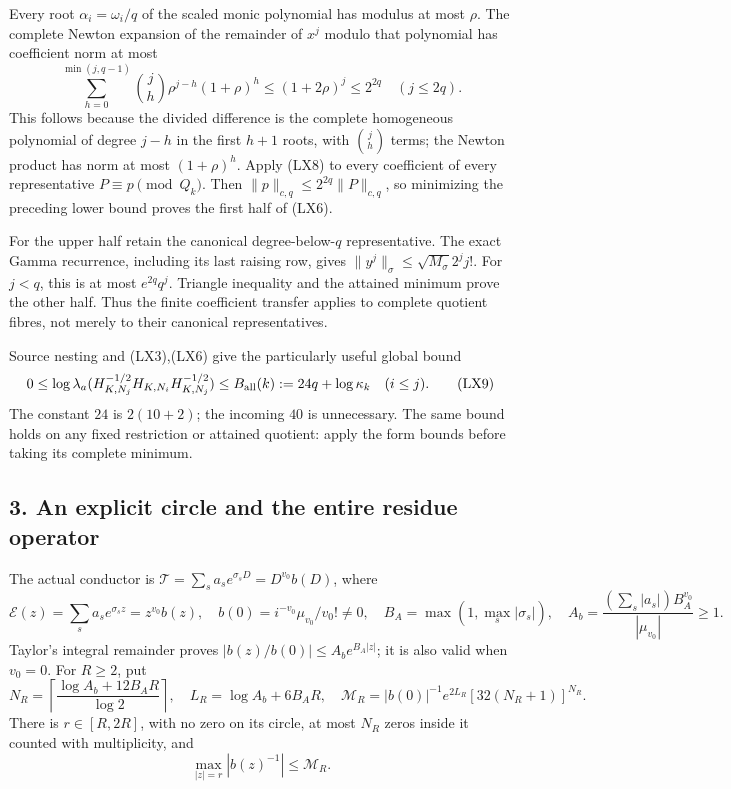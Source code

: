 \documentclass[10pt]{article}
\begin{document}
Every root \(\alpha_i=\omega_i/q\) of the scaled monic polynomial has modulus at most \(\rho\). The complete Newton expansion of the remainder of \(x^j\) modulo that polynomial has coefficient norm at most \[
\sum_{h=0}^{\min(j,q-1)}\binom jh\rho^{j-h}(1+\rho)^h
\le(1+2\rho)^j\le2^{2q}\quad(j\le2q).
\tag{LX8}
\] This follows because the divided difference is the complete homogeneous polynomial of degree \(j-h\) in the first \(h+1\) roots, with \(\binom jh\) terms; the Newton product has norm at most \((1+\rho)^h\). Apply (LX8) to every coefficient of every representative \(P\equiv p\pmod{Q_k}\). Then \(\|p\|_{c,q}\le2^{2q}\|P\|_{c,q}\), so minimizing the preceding lower bound proves the first half of (LX6).

For the upper half retain the canonical degree-below-\(q\) representative. The exact Gamma recurrence, including its last raising row, gives \(\|y^j\|_\sigma\le\sqrt{M_\sigma}2^jj!\). For \(j<q\), this is at most \(e^{2q}q^j\). Triangle inequality and the attained minimum prove the other half. Thus the finite coefficient transfer applies to complete quotient fibres, not merely to their canonical representatives.

Source nesting and (LX3),(LX6) give the particularly useful global bound \[
0\le\log\lambda_a(H_{K,N_j}^{-1/2}H_{K,N_i}H_{K,N_j}^{-1/2})
\le B_{\rm all}(k):=24q+\log\kappa_k\quad(i\le j).
\tag{LX9}
\] The constant \(24\) is \(2(10+2)\); the incoming \(40\) is unnecessary. The same bound holds on any fixed restriction or attained quotient: apply the form bounds before taking its complete minimum.

\subsection{3. An explicit circle and the entire residue operator}\label{an-explicit-circle-and-the-entire-residue-operator}

The actual conductor is \(\mathcal T=\sum_sa_s e^{\sigma_sD}=D^{v_0}b(D)\), where \[
\mathcal E(z)=\sum_sa_se^{\sigma_sz}=z^{v_0}b(z),\quad
b(0)=i^{-v_0}\mu_{v_0}/v_0!\ne0,
\quad B_A=\max(1,\max_s|\sigma_s|),
\quad A_b=\frac{(\sum_s|a_s|)B_A^{v_0}}{|\mu_{v_0}|}\ge1.
\] Taylor's integral remainder proves \(|b(z)/b(0)|\le A_be^{B_A|z|}\); it is also valid when \(v_0=0\). For \(R\ge2\), put \[
N_R=\left\lceil\frac{\log A_b+12B_AR}{\log2}\right\rceil,
\quad L_R=\log A_b+6B_AR,
\quad\mathcal M_R=|b(0)|^{-1}e^{2L_R}[32(N_R+1)]^{N_R}.
\tag{LX10}
\] There is \(r\in[R,2R]\), with no zero on its circle, at most \(N_R\) zeros inside it counted with multiplicity, and \[
\max_{|z|=r}|b(z)^{-1}|\le\mathcal M_R.
\tag{LX11}
\]
\end{document}
